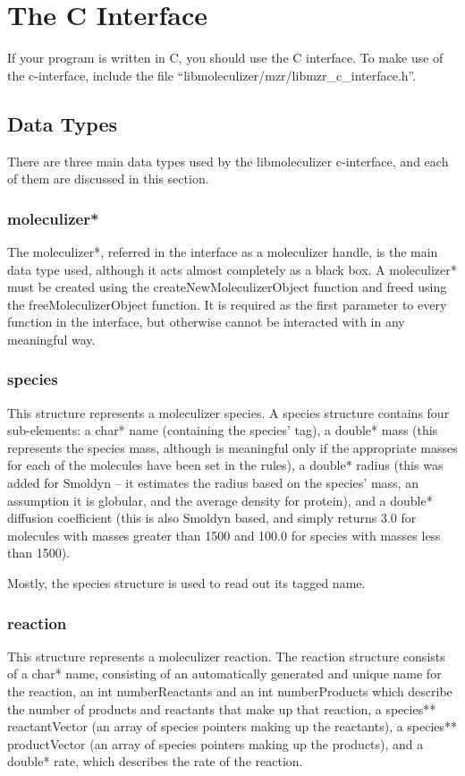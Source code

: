 \section{The C Interface}

If your program is written in C, you should use the C interface.  To
make use of the c-interface, include the file
``libmoleculizer/mzr/libmzr\_c\_interface.h''.  


\subsection{Data Types}
There are three main data types used by the libmoleculizer
c-interface, and each of them are discussed in this section.

\subsubsection{moleculizer*}
The moleculizer*, referred in the interface as a moleculizer handle,
is the main data type used, although it acts almost completely as a
black box.  A moleculizer* must be created using the
createNewMoleculizerObject function and freed using the
freeMoleculizerObject function.  It is required as the first parameter
to every function in the interface, but otherwise cannot be interacted
with in any meaningful way.

\subsubsection{ species }
This structure represents a moleculizer species.  A species structure
contains four sub-elements: a char* name  (containing the species'
tag), a double* mass (this represents the species mass, although is
meaningful only if the appropriate masses for each of the molecules
have been set in the rules), a double* radius (this was added for
Smoldyn -- it estimates the radius based on the species' mass, an
assumption it is globular, and the average density for protein), and a
double* diffusion coefficient (this is also Smoldyn based, and simply
returns 3.0 for molecules with masses greater than 1500 and 100.0 for
species with masses less than 1500). 

Mostly, the species structure is used to read out its tagged name.

\subsubsection{ reaction }
This structure represents a moleculizer reaction.  The reaction
structure consists of a char* name, consisting of an automatically
generated and unique name for the reaction, an int numberReactants
and an int numberProducts which describe the number of products and
reactants that make up that reaction, a species** reactantVector (an
array of species pointers making up the reactants), a species**
productVector (an array of species pointers making up the products),
and a double* rate, which describes the rate of the reaction.  

